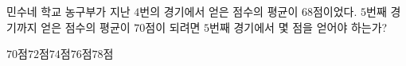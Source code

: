 민수네 학교 농구부가 지난 $4$번의 경기에서 얻은 점수의 평균이 $68$점이었다. $5$번째 경기까지 얻은 점수의 평균이 $70$점이 되려면 $5$번째 경기에서 몇 점을 얻어야 하는가?
\begin{choices32}{$70$점}{$72$점}{$74$점}{$76$점}{$78$점}\end{choices32}
